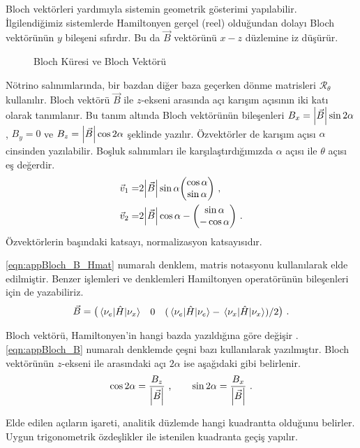 \begin{appendices}
Bloch vektörleri yardımıyla sistemin geometrik gösterimi yapılabilir. İlgilendiğimiz sistemlerde Hamiltonyen gerçel (reel) olduğundan dolayı Bloch vektörünün $ y $ bileşeni sıfırdır. Bu da $ \vec{B} $ vektörünü $ x-z $ düzlemine iz düşürür. 
\begin{figure}[!hbt]
	\centering
    
    \caption[Bloch Küresi ve Bloch Vektörü]{Bloch Küresi ve Bloch Vektörü}
    \label{fig:blochVec}%
\end{figure}

Nötrino salınımlarında, bir bazdan diğer baza geçerken dönme matrisleri $ \mathcal{R}_{\theta} $ kullanılır. Bloch vektörü $ \vec{B} $ ile $ z $-ekseni arasında açı karışım açısının iki katı olarak tanımlanır. Bu tanım altında Bloch vektörünün bileşenleri $ B_{x} = \abs{\vec{B}}\sin 2\alpha $, $ B_{y}=0 $ ve $ B_{z} = \abs{\vec{B}} \cos 2\alpha $ şeklinde yazılır. Özvektörler de karışım açısı $ \alpha $ cinsinden yazılabilir. Boşluk salınımları ile karşılaştırdığımızda $ \alpha $ açısı ile $ \theta $ açısı eş değerdir.
\begin{align} \label{eqn:appBloch_B_Ozvec}
    \vec{v}_{1} =& 2 \abs{\vec{B}} \sin \alpha \mqty(\cos \alpha \\ \sin \alpha) \text{ ,}\\
    \vec{v}_{2} =& 2 \abs{\vec{B}} \cos \alpha -\mqty(\sin \alpha \\-\cos \alpha) \text{ .}
\end{align}
Özvektörlerin başındaki katsayı, normalizasyon katsayısıdır.

\eqref{eqn:appBloch_B_Hmat} numaralı denklem, matris notasyonu kullanılarak elde edilmiştir. Benzer işlemleri ve denklemleri Hamiltonyen operatörünün bileşenleri için de yazabiliriz.
\begin{equation} \label{eqn:appBloch_B}
    \vec{B} = \mqty(\mel{\nu_{e}}{\hat{H}}{\nu_{x}} & 0 & (\mel{\nu_{e}}{\hat{H}}{\nu_{e}} - \mel{\nu_{x}}{\hat{H}}{\nu_{x}})/2  ) \text{ .}
\end{equation}

Bloch vektörü, Hamiltonyen'in hangi bazda yazıldığına göre değişir \cite{Pehlivan:2011hp}. \eqref{eqn:appBloch_B} numaralı denklemde çeşni bazı kullanılarak yazılmıştır. Bloch vektörünün $ z $-ekseni ile arasındaki açı $ 2\alpha $ ise aşağıdaki gibi belirlenir.
\begin{equation} \label{eqn:appBloch_mixAng}
\cos 2\alpha = \frac{B_{z}}{\abs{\vec{B}}} \text{ ,} \qquad \sin 2\alpha = \frac{B_{x}}{\abs{\vec{B}}} \text{ .}
\end{equation}

Elde edilen açıların işareti, analitik düzlemde hangi kuadrantta olduğunu belirler. Uygun trigonometrik özdeşlikler ile istenilen kuadranta geçiş yapılır. 

\end{appendices}